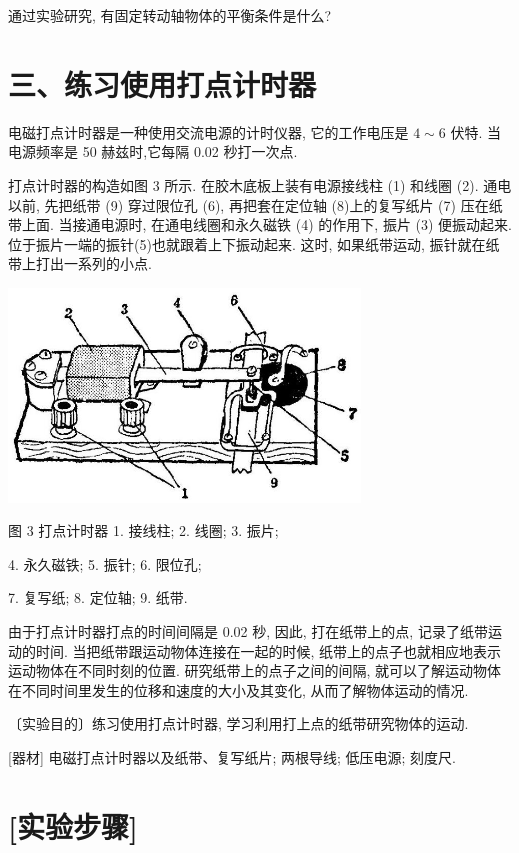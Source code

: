 \documentclass[10pt]{article}
\begin{document}
通过实验研究, 有固定转动轴物体的平衡条件是什么?

\section*{三、练习使用打点计时器}

电磁打点计时器是一种使用交流电源的计时仪器, 它的工作电压是 \(4 \sim 6\) 伏特. 当电源频率是 50 赫兹时,它每隔 0.02 秒打一次点.

打点计时器的构造如图 3 所示. 在胶木底板上装有电源接线柱 (1) 和线圈 (2). 通电以前, 先把纸带 (9) 穿过限位孔 (6), 再把套在定位轴 (8)上的复写纸片 (7) 压在纸带上面. 当接通电源时, 在通电线圈和永久磁铁 (4) 的作用下, 振片 (3) 便振动起来. 位于振片一端的振针(5)也就跟着上下振动起来. 这时, 如果纸带运动, 振针就在纸带上打出一系列的小点.

\begin{center}
\includegraphics[max width=0.7\textwidth]{images/01912d55-147c-70aa-b0e0-1782a122f948_317_822840.jpg}
\end{center}

图 3 打点计时器 1. 接线柱; 2. 线圈; 3. 振片;

4. 永久磁铁; 5. 振针; 6. 限位孔;

7. 复写纸; 8. 定位轴; 9. 纸带.

由于打点计时器打点的时间间隔是 0.02 秒, 因此, 打在纸带上的点, 记录了纸带运动的时间. 当把纸带跟运动物体连接在一起的时候, 纸带上的点子也就相应地表示运动物体在不同时刻的位置. 研究纸带上的点子之间的间隔, 就可以了解运动物体在不同时间里发生的位移和速度的大小及其变化, 从而了解物体运动的情况.

〔实验目的〕练习使用打点计时器, 学习利用打上点的纸带研究物体的运动.

[器材] 电磁打点计时器以及纸带、复写纸片; 两根导线; 低压电源; 刻度尺.

\section*{[实验步骤]}
\end{document}
